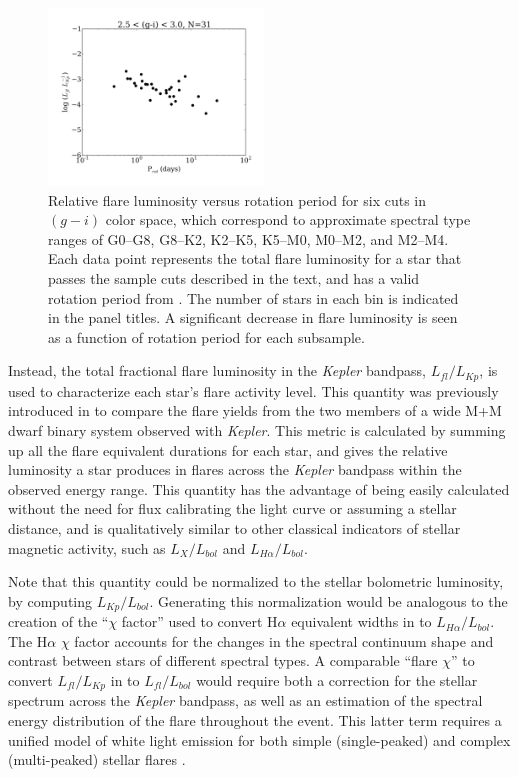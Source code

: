 \documentclass[twocolumn]{aastex6}
\newcommand{\Kepler}{\textsl{Kepler}\xspace}
\begin{document}
\begin{figure}[!t]
\includegraphics[width=2.25in]{fig7f}
\caption{
Relative flare luminosity versus rotation period for six cuts in $(g-i)$ color space, which correspond to approximate spectral type ranges of G0--G8, G8--K2, K2--K5, K5--M0, M0--M2, and M2--M4. Each data point represents the total flare luminosity for a star that passes the sample cuts described in the text, and has a valid rotation period from \citet{mcquillan2014}. The number of stars in each bin is indicated in the panel titles. A significant decrease in flare luminosity is seen as a function of rotation period for each subsample.
}
\label{fig:ratecolor}
\end{figure}



Instead, the total fractional flare luminosity in the \Kepler bandpass, $L_{fl}/L_{Kp}$, is used to characterize each star's flare activity level. This quantity was previously introduced in \citet{lurie2015} to compare the flare yields from the two members of a wide M+M dwarf binary system observed with \Kepler. This metric is calculated by summing up all the flare equivalent durations for each star, and gives the relative luminosity a star produces in flares across the \Kepler bandpass within the observed energy range. This quantity has the advantage of being easily calculated without the need for flux calibrating the light curve or assuming a stellar distance, and is qualitatively similar to other classical indicators of stellar magnetic activity, such as $L_X/L_{bol}$ and $L_{H\alpha}/L_{bol}$.


Note that this quantity could be normalized to the stellar bolometric luminosity, by computing $L_{Kp}/L_{bol}$. Generating this normalization would be analogous to the creation of the ``$\chi$ factor'' used to convert H$\alpha$ equivalent widths in to $L_{H\alpha}/L_{bol}$. The H$\alpha$ $\chi$ factor accounts for the changes in the spectral continuum shape and contrast between stars of different spectral types. A comparable ``flare $\chi$'' to convert $L_{fl}/L_{Kp}$ in to $L_{fl}/L_{bol}$ would require both a correction for the stellar spectrum across the \Kepler bandpass, as well as an estimation of the spectral energy distribution of the flare throughout the event. This latter term requires a unified model of white light emission for both simple (single-peaked) and complex (multi-peaked) stellar flares \citep{allred2015}.
\end{document}
